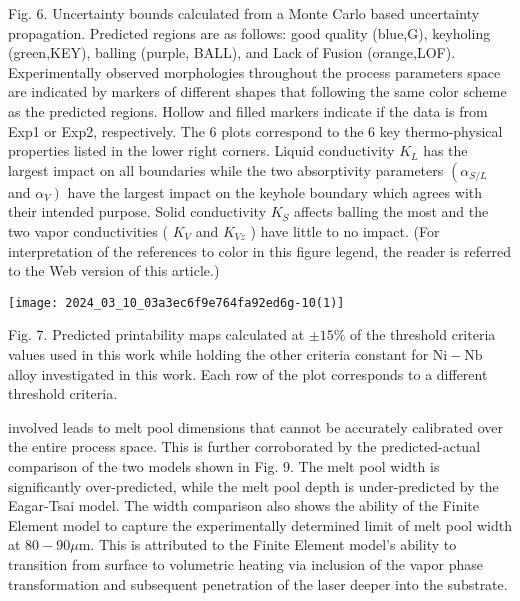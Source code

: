 \documentclass[10pt]{article}
\begin{document}
Fig. 6. Uncertainty bounds calculated from a Monte Carlo based uncertainty propagation. Predicted regions are as follows: good quality (blue,G), keyholing (green,KEY), balling (purple, BALL), and Lack of Fusion (orange,LOF). Experimentally observed morphologies throughout the process parameters space are indicated by markers of different shapes that following the same color scheme as the predicted regions. Hollow and filled markers indicate if the data is from Exp1 or Exp2, respectively. The 6 plots correspond to the 6 key thermo-physical properties listed in the lower right corners. Liquid conductivity $K_{L}$ has the largest impact on all boundaries while the two absorptivity parameters $\left(\alpha_{S / L}\right.$ and $\left.\alpha_{V}\right)$ have the largest impact on the keyhole boundary which agrees with their intended purpose. Solid conductivity $K_{S}$ affects balling the most and the two vapor conductivities ( $K_{V}$ and $K_{V z}$ ) have little to no impact. (For interpretation of the references to color in this figure legend, the reader is referred to the Web version of this article.)

\begin{center}
\texttt{[image: 2024\_03\_10\_03a3ec6f9e764fa92ed6g-10(1)]}
\end{center}

Fig. 7. Predicted printability maps calculated at $\pm 15 \%$ of the threshold criteria values used in this work while holding the other criteria constant for $\mathrm{Ni}-\mathrm{Nb}$ alloy investigated in this work. Each row of the plot corresponds to a different threshold criteria.

involved leads to melt pool dimensions that cannot be accurately calibrated over the entire process space. This is further corroborated by the predicted-actual comparison of the two models shown in Fig. 9. The melt pool width is significantly over-predicted, while the melt pool depth is under-predicted by the Eagar-Tsai model. The width comparison also shows the ability of the Finite Element model to capture the experimentally determined limit of melt pool width at $80-90 \mu \mathrm{m}$. This is attributed to the Finite Element model's ability to transition from surface to volumetric heating via inclusion of the vapor phase transformation and subsequent penetration of the laser deeper into the substrate.
\end{document}
